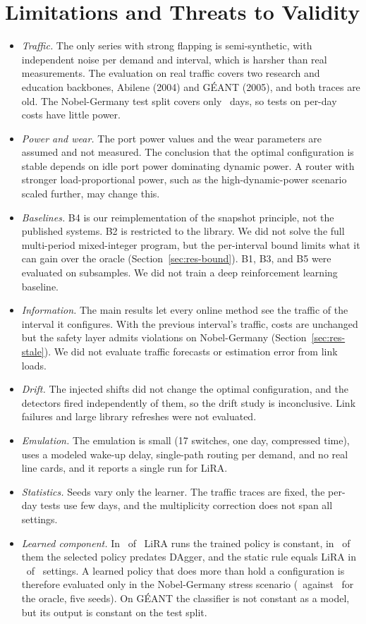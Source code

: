 \documentclass[preprint,12pt]{elsarticle}
\begin{document}
\section{Limitations and Threats to Validity}\label{sec:limitations}

\begin{itemize}
\item \emph{Traffic.} The only series with strong flapping is semi-synthetic, with independent noise per demand and interval, which is harsher than real measurements. The evaluation on real traffic covers two research and education backbones, Abilene (2004) and G\'{E}ANT (2005), and both traces are old. The Nobel-Germany test split covers only \nobTestDays\ days, so tests on per-day costs have little power.
\item \emph{Power and wear.} The port power values and the wear parameters are assumed and not measured. The conclusion that the optimal configuration is stable depends on idle port power dominating dynamic power. A router with stronger load-proportional power, such as the high-dynamic-power scenario scaled further, may change this.
\item \emph{Baselines.} B4 is our reimplementation of the snapshot principle, not the published systems. B2 is restricted to the library. We did not solve the full multi-period mixed-integer program, but the per-interval bound limits what it can gain over the oracle (Section~\ref{sec:res-bound}). B1, B3, and B5 were evaluated on subsamples. We did not train a deep reinforcement learning baseline.
\item \emph{Information.} The main results let every online method see the traffic of the interval it configures. With the previous interval's traffic, costs are unchanged but the safety layer admits violations on Nobel-Germany (Section~\ref{sec:res-stale}). We did not evaluate traffic forecasts or estimation error from link loads.
\item \emph{Drift.} The injected shifts did not change the optimal configuration, and the detectors fired independently of them, so the drift study is inconclusive. Link failures and large library refreshes were not evaluated.
\item \emph{Emulation.} The emulation is small (17 switches, one day, compressed time), uses a modeled wake-up delay, single-path routing per demand, and no real line cards, and it reports a single run for LiRA.
\item \emph{Statistics.} Seeds vary only the learner. The traffic traces are fixed, the per-day tests use few days, and the multiplicity correction does not span all settings.
\item \emph{Learned component.} In \liraConstRuns\ of \liraTotalRuns\ LiRA runs the trained policy is constant, in \daggerRoundZero\ of them the selected policy predates DAgger, and the static rule equals LiRA in \staticSame\ of \staticTotal\ settings. A learned policy that does more than hold a configuration is therefore evaluated only in the Nobel-Germany stress scenario (\nobJLiRAst\ against \nobJOst\ for the oracle, five seeds). On G\'{E}ANT the classifier is not constant as a model, but its output is constant on the test split.
\end{itemize}
\end{document}
